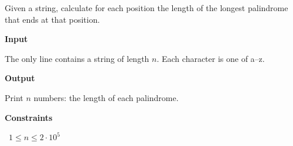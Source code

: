 Given a string, calculate for each position the length of the longest palindrome that ends at that position.

\vspace{0.3cm}\noindent\textbf{Input}

The only line contains a string of length $n$. Each character is one of a–z.

\vspace{0.3cm}\noindent\textbf{Output}

Print $n$ numbers: the length of each palindrome.

\vspace{0.3cm}\noindent\textbf{Constraints}

\textbullet\ $1 \le n \le 2 \cdot 10^5$
